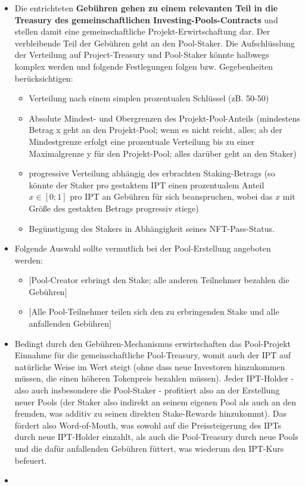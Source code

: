 \begin{itemize}
\begin{itemize}
  	\item Die entrichteten \textbf{Gebühren gehen zu einem relevanten Teil in die Treasury des gemeinschaftlichen Investing-Pools-Contracts} und stellen damit eine gemeinschaftliche Projekt-Erwirtschaftung dar. Der verbleibende Teil der Gebühren geht an den Pool-Staker. Die Aufschlüsslung der Verteilung auf Project-Treasury und Pool-Staker könnte halbwegs komplex werden und folgende Festlegungen folgen bzw. Gegebenheiten berücksichtigen:
  	\begin{itemize}
  		\item Verteilung nach einem simplen prozentualen Schlüssel (zB. 50-50)
  		\item Absolute Mindest- und Obergrenzen des Projekt-Pool-Anteils (mindestens Betrag x geht an den Projekt-Pool; wenn es nicht reicht, alles; ab der Mindestgrenze erfolgt eine prozentuale Verteilung bis zu einer Maximalgrenze y für den Projekt-Pool; alles darüber geht an den Staker)
  		\item progressive Verteilung abhängig des erbrachten Staking-Betrags (so könnte der Staker pro gestaktem IPT einen prozentualem Anteil $x \in [0; 1]$ pro IPT an Gebühren für sich beanspruchen, wobei das $x$ mit Größe des gestakten Betrags progressiv stiege)
  		 \item Begünstigung des Stakers in Abhängigkeit seines NFT-Pass-Status.
  	\end{itemize}
  	\item Folgende Auswahl sollte vermutlich bei der Pool-Erstellung angeboten werden:
  	\begin{itemize}
  		\item $[$Pool-Creator erbringt den Stake; alle anderen Teilnehmer bezahlen die Gebühren$]$
  		\item $[$Alle Pool-Teilnehmer teilen sich den zu erbringenden Stake und alle anfallenden Gebühren$]$
  	\end{itemize} 
  	\item Bedingt durch den Gebühren-Mechanismus erwirtschaften das Pool-Projekt Einnahme für die gemeinschaftliche Pool-Treasury, womit auch der IPT auf natürliche Weise im Wert steigt (ohne dass neue Investoren hinzukommen müssen, die einen höheren Tokenpreis bezahlen müssen). Jeder IPT-Holder - also auch insbesondere die Pool-Staker - profitiert also an der Erstellung neuer Pools (der Staker also indirekt an seinem eigenen Pool als auch an den fremden, was additiv zu seinen direkten Stake-Rewards hinzukommt). Das fördert also Word-of-Mouth, was sowohl auf die Preissteigerung des IPTs durch neue IPT-Holder einzahlt, als auch die Pool-Treasury durch neue Pools und die dafür anfallenden Gebühren füttert, was wiederum den IPT-Kurs befeuert.
  	\item
  \end{itemize}
\end{itemize}


\newpage
